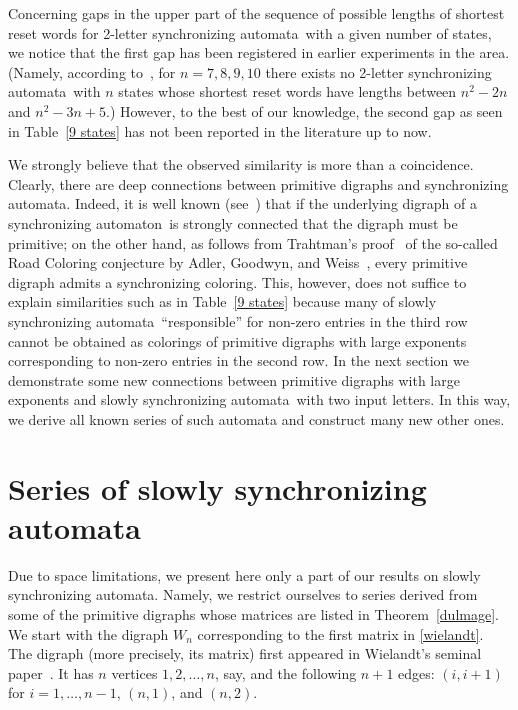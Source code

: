 \documentclass[11pt]{llncs}
\newcommand{\sa}{synchronizing automata}
\newcommand{\san}{synchronizing automaton}
\begin{document}
Concerning gaps in the upper part of the sequence of possible lengths of shortest
reset words for 2-letter \sa\ with a given number of states, we notice that
the first gap has been registered in earlier experiments in the area. (Namely, according
to~\cite{Tr06,Tr06a}, for $n=7,8,9,10$ there exists no 2-letter \sa\ with $n$ states
whose shortest reset words have lengths between $n^2-2n$ and $n^2-3n+5$.) However,
to the best of our knowledge, the second gap as seen in Table~\ref{9 states} has not
been reported in the literature up to now.

We strongly believe that the observed similarity is more than a coincidence.
Clearly, there are deep connections between primitive digraphs and \sa. Indeed,
it is well known (see~\cite{AGW}) that if the underlying digraph of a \san\
is strongly connected that the digraph must be primitive; on the other hand,
as follows from Trahtman's proof~\cite{Tr09} of the so-called Road Coloring
conjecture by Adler, Goodwyn, and Weiss~\cite{AGW}, every primitive digraph
admits a synchronizing coloring. This, however, does not suffice to explain
similarities such as in Table~\ref{9 states} because many of slowly \sa\
``responsible'' for non-zero entries in the third row cannot be obtained
as colorings of primitive digraphs with large exponents corresponding
to non-zero entries in the second row. In the next section we demonstrate
some new connections between primitive digraphs with large exponents and
slowly \sa\ with two input letters. In this way, we derive all known
series of such automata and construct many new other ones.

\section{Series of slowly \sa}
\label{sss}

Due to space limitations, we present here only a part of our results on slowly \sa.
Namely, we restrict ourselves to series derived from some of the primitive digraphs
whose matrices are listed in Theorem~\ref{dulmage}. We start with the digraph $W_n$
corresponding to the first matrix in \eqref{wielandt}. The digraph (more precisely,
its matrix) first appeared in Wielandt's seminal paper~\cite{Wi50}. It has $n$
vertices $1,2,\dots,n$, say, and the following $n+1$ edges: $(i,i+1)$ for
$i=1,\dots,n-1$, $(n,1)$, and $(n,2)$.
\end{document}
